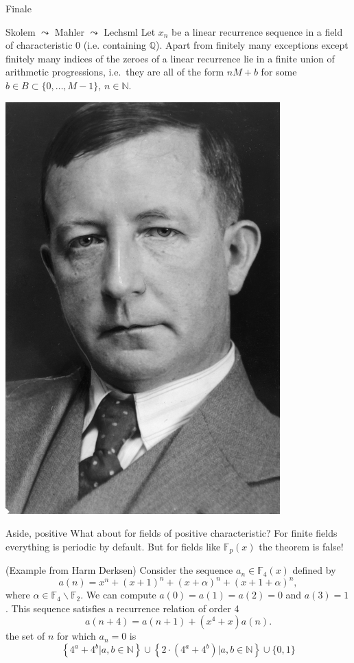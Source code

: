 \documentclass[notheorems]{beamer}
\theoremstyle{plain}
\newcommand{\NN}{\mathbb{N}}
\newcommand{\QQ}{\mathbb Q}
\newcommand{\FF}{\mathbb F}
\begin{document}
\begin{frame}{Finale}
    \begin{theorem}{Skolem \(\leadsto\) Mahler \(\leadsto\) Lech}{sml}
        Let $x_n$ be a linear recurrence sequence in a field of characteristic 0 (i.e. containing $\QQ$).
        Apart from finitely many exceptions except finitely many indices of the zeroes of a linear recurrence lie in a finite union of arithmetic progressions, i.e.\ they are all of the form \(nM + b\) for some \(b \in B \subset \{0, \ldots, M-1\}\), \(n \in \NN\).%
    \end{theorem}
    \pause
    \includegraphics[height = 0.6\textheight]{skolem.jpeg}
\end{frame}

\begin{frame}{Aside, positive }
    What about for fields of positive characteristic?
    \pause
    For finite fields everything is periodic by default.
    \pause
    But for fields like $\FF_p(x)$ the theorem is false!
    \pause

    (Example from Harm Derksen) Consider the sequence $a_n \in \mathbb{F}_4(x)$ defined by
    $$
    a(n)=x^n+(x+1)^n+(x+\alpha)^n+(x+1+\alpha)^n,
    $$
    where $\alpha \in \mathbb{F}_4 \backslash \mathbb{F}_2$. We can compute $a(0)=a(1)=a(2)=0$ and $a(3)=1$. This sequence satisfies a recurrence relation of order 4
    $$
    a(n+4)=a(n+1)+\left(x^4+x\right) a(n) .
    $$
    the set of $n$ for which $a_n = 0$ is
    \[
        \left\{4^a+4^b | a, b \in \mathbb{N}\right\} \cup\left\{2 \cdot\left(4^a+4^b\right) | a, b \in \mathbb{N}\right\} \cup\{0,1\}
    \]
\end{frame}
\end{document}
